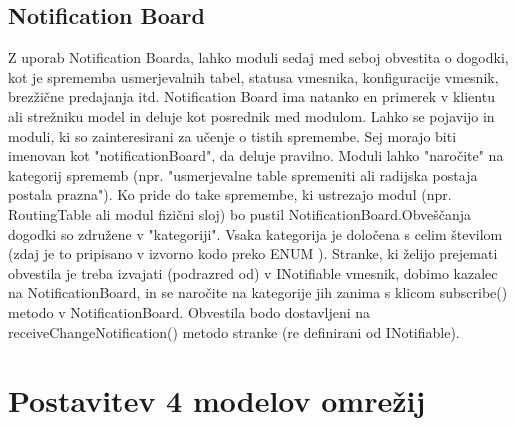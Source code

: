 \documentclass[11pt,a4paper,slovene]{myarticle}
\begin{document}
\subsection{Notification Board}
Z uporab Notification Boarda, lahko moduli sedaj med seboj obvestita o dogodki, kot je sprememba usmerjevalnih tabel, statusa vmesnika, konfiguracije vmesnik, brezžične predajanja itd.
Notification Board ima natanko en primerek v klientu ali strežniku model in deluje kot posrednik med modulom.
Lahko se pojavijo in moduli, ki so zainteresirani za učenje o tistih spremembe. Sej morajo biti imenovan kot "notificationBoard", da deluje pravilno.
Moduli lahko "naročite" na kategorij sprememb (npr. "usmerjevalne table spremeniti ali radijska postaja postala prazna"). Ko pride do take spremembe, ki ustrezajo
modul (npr. ~ RoutingTable ali modul fizični sloj) bo pustil  NotificationBoard.Obveščanja dogodki so združene v "kategoriji".
Vsaka kategorija je določena s celim številom (zdaj je to pripisano v izvorno kodo preko ENUM ).
Stranke, ki želijo prejemati obvestila je treba izvajati (podrazred od) v INotifiable vmesnik, dobimo kazalec na NotificationBoard, in se naročite na kategorije jih zanima 
s klicom subscribe() metodo v NotificationBoard. Obvestila bodo dostavljeni na receiveChangeNotification() metodo stranke (re definirani od INotifiable).

\section{Postavitev 4 modelov omrežij}
\end{document}
